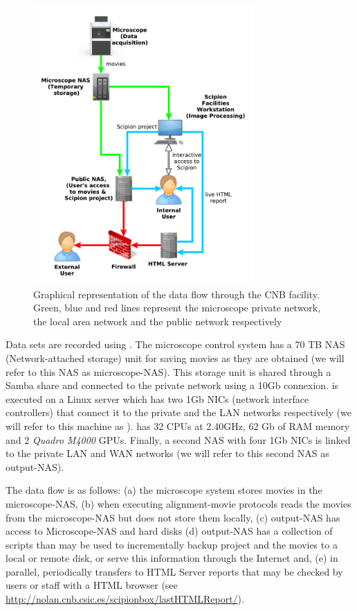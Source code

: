 \begin{figure}
  \centering
      \includegraphics[width=0.75\textwidth]{images/diagram.pdf}
  \caption{Graphical representation of the data flow through the CNB facility. Green, blue and red lines represent the microscope private network, the \cnb local area network and the public network respectively}
  \label{fig:cnbpipeline}

\end{figure}

Data sets are recorded using \epu. The microscope control system has a 70 TB NAS (Network-attached storage) unit for saving movies as they are obtained (we will refer to this NAS as microscope-NAS). This storage unit is shared through a Samba share and connected to the private network using a 10Gb connexion. \scipion is executed on a Linux server which has two 1Gb NICs (network interface controllers) that connect it to the private and the LAN networks respectively (we will refer to this machine as \scipionbox). \scipionbox has 32 CPUs at 2.40GHz, 62 Gb of RAM memory and 2 \textit{Quadro M4000} GPUs. Finally, a second NAS with four 1Gb NICs is linked to the private LAN and WAN networks (we will refer to this second NAS as output-NAS).

The data flow is as follows: (a) the microscope system stores movies in the microscope-NAS, (b) when executing alignment-movie protocols \scipionbox reads the movies from the microscope-NAS but does not store them locally, (c) output-NAS has access to Microscope-NAS and \scipionbox hard disks (d) output-NAS has a collection of scripts than may be used to incrementally backup \scipion project and the movies to a local or remote disk, or serve this information through the Internet and, (e) in parallel, periodically \scipionbox transfers to  HTML Server reports that may be checked by users or staff with a HTML browser (see \url{http://nolan.cnb.csic.es/scipionbox/lastHTMLReport/}).

